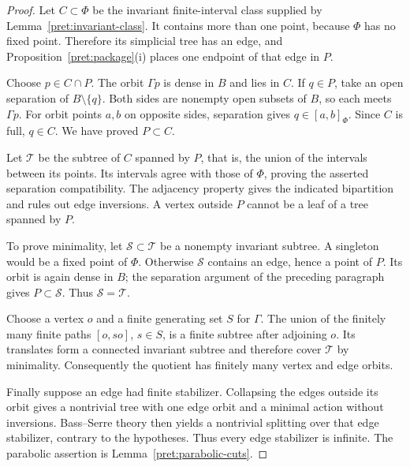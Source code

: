 \begin{proof}
Let $C\subset\Phi$ be the invariant finite-interval class supplied by
Lemma~\ref{pret:invariant-class}.  It contains more than one point,
because $\Phi$ has no fixed point.  Therefore its simplicial tree has
an edge, and Proposition~\ref{pret:package}\textup{(i)} places one
endpoint of that edge in $P$.

Choose $p\in C\cap P$.  The orbit $\Gamma p$ is dense in $B$ and lies
in $C$.  If $q\in P$, take an open separation of $B\setminus\{q\}$.
Both sides are nonempty open subsets of $B$, so each meets $\Gamma p$.
For orbit points $a,b$ on opposite sides, separation gives
$q\in[a,b]_{\Phi}$.  Since $C$ is full, $q\in C$.  We have proved
$P\subset C$.

Let $\mathcal T$ be the subtree of $C$ spanned by $P$, that is, the union
of the intervals between its points.  Its intervals agree with those of
$\Phi$, proving the asserted separation compatibility.  The adjacency
property gives the indicated bipartition and rules out edge inversions.
A vertex outside $P$ cannot be a leaf of a tree spanned by $P$.

To prove minimality, let $\mathcal S\subset\mathcal T$ be a nonempty
invariant subtree.  A singleton would be a fixed point of $\Phi$.
Otherwise $\mathcal S$ contains an edge, hence a point of $P$.
Its orbit is again dense in $B$; the separation argument of the preceding
paragraph gives $P\subset\mathcal S$.  Thus
$\mathcal S=\mathcal T$.

Choose a vertex $o$ and a finite generating set $S$ for $\Gamma$.
The union of the finitely many finite paths $[o,so]$, $s\in S$, is a
finite subtree after adjoining $o$.  Its translates form a connected
invariant subtree and therefore cover $\mathcal T$ by minimality.
Consequently the quotient has finitely many vertex and edge orbits.

Finally suppose an edge had finite stabilizer.  Collapsing the edges
outside its orbit gives a nontrivial tree with one edge orbit and a
minimal action without inversions.  Bass--Serre theory then yields a
nontrivial splitting over that edge stabilizer, contrary to the
hypotheses.  Thus every edge stabilizer is infinite.  The parabolic
assertion is Lemma~\ref{pret:parabolic-cuts}.
\end{proof}
